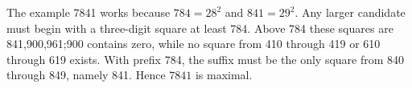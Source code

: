 The example 7841 works because $ 784=28^2 $ and $ 841=29^2 $. Any larger candidate must begin with a three-digit square at least 784. Above 784 these squares are 841,900,961;900 contains zero, while no square from 410 through 419 or 610 through 619 exists. With prefix 784, the suffix must be the only square from 840 through 849, namely 841. Hence $\boxed{7841}$ is maximal.
